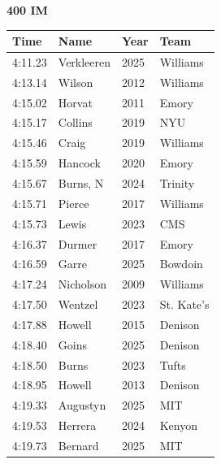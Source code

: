 \noindent\begin{minipage}[t]{0.98\textwidth}
\centering
\textbf{\textcolor{teamprimary}{400 IM}}\par
\vspace{0.5em}
\centering
\small
\renewcommand{\arraystretch}{1.0}
\setlength{\tabcolsep}{4pt}
\begin{tabular}{@{}p{2.5cm}p{4.5cm}p{1.5cm}p{2.5cm}@{}}
\toprule
\textbf{Time} & \textbf{Name} & \textbf{Year} & \textbf{Team} \\
\midrule
4:11.23 & Verkleeren & 2025 & Williams \\
4:13.14 & Wilson & 2012 & Williams \\
4:15.02 & Horvat & 2011 & Emory \\
4:15.17 & Collins & 2019 & NYU \\
4:15.46 & Craig & 2019 & Williams \\
4:15.59 & Hancock & 2020 & Emory \\
4:15.67 & Burns, N & 2024 & Trinity \\
4:15.71 & Pierce & 2017 & Williams \\
4:15.73 & Lewis & 2023 & CMS \\
4:16.37 & Durmer & 2017 & Emory \\
4:16.59 & Garre & 2025 & Bowdoin \\
4:17.24 & Nicholson & 2009 & Williams \\
4:17.50 & Wentzel & 2023 & St. Kate's \\
4:17.88 & Howell & 2015 & Denison \\
4:18.40 & Goins & 2025 & Denison \\
4:18.50 & Burns & 2023 & Tufts \\
4:18.95 & Howell & 2013 & Denison \\
4:19.33 & Augustyn & 2025 & MIT \\
4:19.53 & Herrera & 2024 & Kenyon \\
4:19.73 & Bernard & 2025 & MIT \\
\bottomrule
\end{tabular}
\end{minipage}
\vspace{1.2em}
